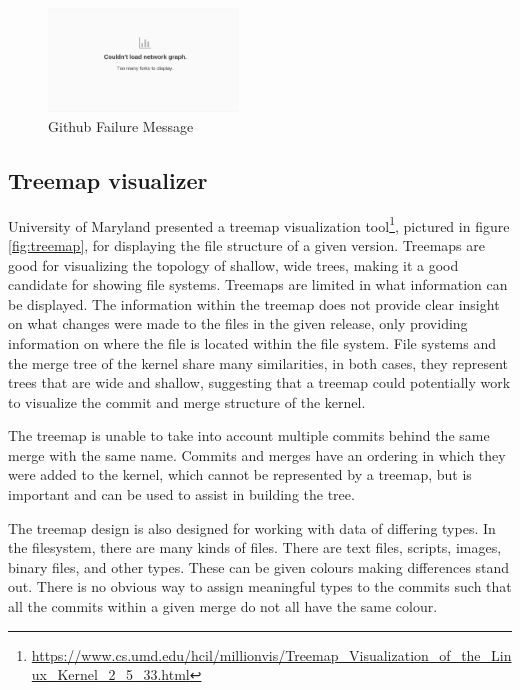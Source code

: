 \documentclass[conference, draftclsnofoot]{IEEEtran}
\begin{document}
\begin{figure}[h!]
	\centering
	\includegraphics[width=0.45\textwidth]{figures/github_viewer.png}
	\caption{Github Failure Message}
	\label{fig:gitfail}
\end{figure}


\subsection{Treemap visualizer}
University of Maryland presented a treemap visualization
tool\footnote{\url{https://www.cs.umd.edu/hcil/millionvis/Treemap_Visualization_of_the_Linux_Kernel_2_5_33.html}},
pictured in figure \ref{fig:treemap}, for
displaying the file structure of a given version. Treemaps are good for
visualizing the topology of shallow, wide trees, making it a good candidate for
showing file systems. Treemaps are limited in what information can be
displayed. The information within the treemap does not provide clear insight on
what changes were made to the files in the given release, only providing
information on where the file is located within the file system.
File systems and the merge tree of the kernel share many similarities, in both
cases, they represent trees that are wide and shallow, suggesting that a
treemap could potentially work to visualize the commit and merge structure of
the kernel.

The treemap is unable to take into account multiple commits behind the same
merge with the same name. Commits and merges have an ordering in which they
were added to the kernel, which cannot be represented by a treemap, but is
important and can be used to assist in building the tree.

The treemap design is also designed for working with data of differing types.
In the filesystem, there are many kinds of files. There are text files,
scripts, images, binary files, and other types. These can be given colours
making differences stand out. There is no obvious way to assign meaningful
types to the commits such that all the commits within a given merge do not all
have the same colour.
\end{document}
